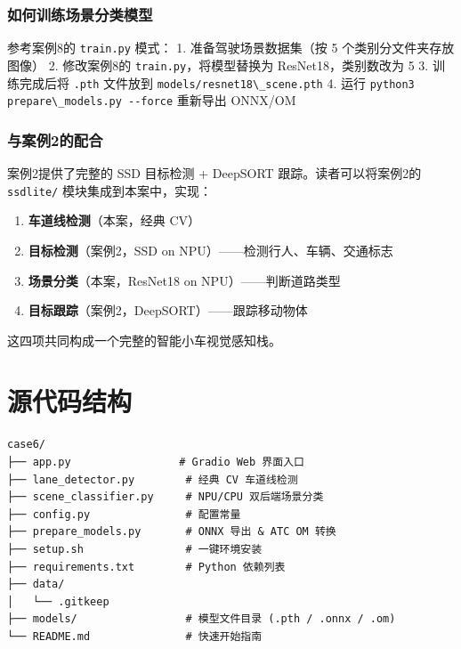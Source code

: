 \subsubsection{如何训练场景分类模型}\label{src-experiment-case6-h27}

参考案例8的 \passthrough{\lstinline!train.py!} 模式： 1.
准备驾驶场景数据集（按 5 个类别分文件夹存放图像） 2. 修改案例8的
\passthrough{\lstinline!train.py!}，将模型替换为 ResNet18，类别数改为 5
3. 训练完成后将 \passthrough{\lstinline!.pth!} 文件放到
\passthrough{\lstinline!models/resnet18\_scene.pth!} 4. 运行
\passthrough{\lstinline!python3 prepare\_models.py --force!} 重新导出
ONNX/OM

\subsubsection{与案例2的配合}\label{src-experiment-case6-h28}

案例2提供了完整的 SSD 目标检测 + DeepSORT 跟踪。读者可以将案例2的
\passthrough{\lstinline!ssdlite/!} 模块集成到本案中，实现：

\begin{enumerate}
\def\labelenumi{\arabic{enumi}.}
\tightlist
\item
  \textbf{车道线检测}（本案，经典 CV）
\item
  \textbf{目标检测}（案例2，SSD on NPU）------检测行人、车辆、交通标志
\item
  \textbf{场景分类}（本案，ResNet18 on NPU）------判断道路类型
\item
  \textbf{目标跟踪}（案例2，DeepSORT）------跟踪移动物体
\end{enumerate}

这四项共同构成一个完整的智能小车视觉感知栈。

\section{源代码结构}\label{src-experiment-case6-h29}

\begin{lstlisting}
case6/
├── app.py                 # Gradio Web 界面入口
├── lane_detector.py        # 经典 CV 车道线检测
├── scene_classifier.py     # NPU/CPU 双后端场景分类
├── config.py               # 配置常量
├── prepare_models.py       # ONNX 导出 & ATC OM 转换
├── setup.sh                # 一键环境安装
├── requirements.txt        # Python 依赖列表
├── data/
│   └── .gitkeep
├── models/                 # 模型文件目录 (.pth / .onnx / .om)
└── README.md               # 快速开始指南
\end{lstlisting}

